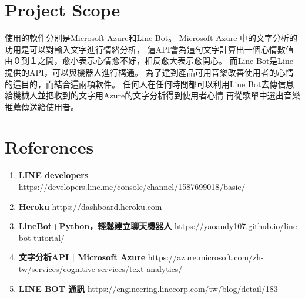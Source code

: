 \documentclass{scrreprt}
\begin{document}
\section{Project Scope}
\begin{CJK}{UTF8}{<font>}
使用的軟件分別是Microsoft Azure和Line Bot。
Microsoft Azure 中的文字分析的功用是可以對輸入文字進行情緒分析，
這API會為這句文字計算出一個心情數值由０到１之間，愈小表示心情愈不好，相反愈大表示愈開心。
而Line Bot是Line提供的API，可以與機器人進行構通。
為了達到產品可用音樂改善使用者的心情的這目的，而結合這兩項軟件。
任何人在任何時間都可以利用Line Bot去傳信息給機械人並把收到的文字用Azure的文字分析得到使用者心情
再從歌單中選出音樂推薦傳送給使用者。
\end{CJK}

\section{References}
\begin{CJK}{UTF8}{<font>}
\begin{enumerate} 
	\item \textbf {LINE developers} \newline
	https://developers.line.me/console/channel/1587699018/basic/
	\item  \textbf {Heroku} \newline
	https://dashboard.heroku.com
	\item \textbf {LineBot+Python，輕鬆建立聊天機器人} \newline
	https://yaoandy107.github.io/line-bot-tutorial/  
	\item  \textbf {文字分析API | Microsoft Azure}  \newline
	https://azure.microsoft.com/zh-tw/services/cognitive-services/text-analytics/
	\item  \textbf { LINE BOT 通訊}  \newline
	https://engineering.linecorp.com/tw/blog/detail/183
\end{enumerate}
\end{CJK}
\end{document}
